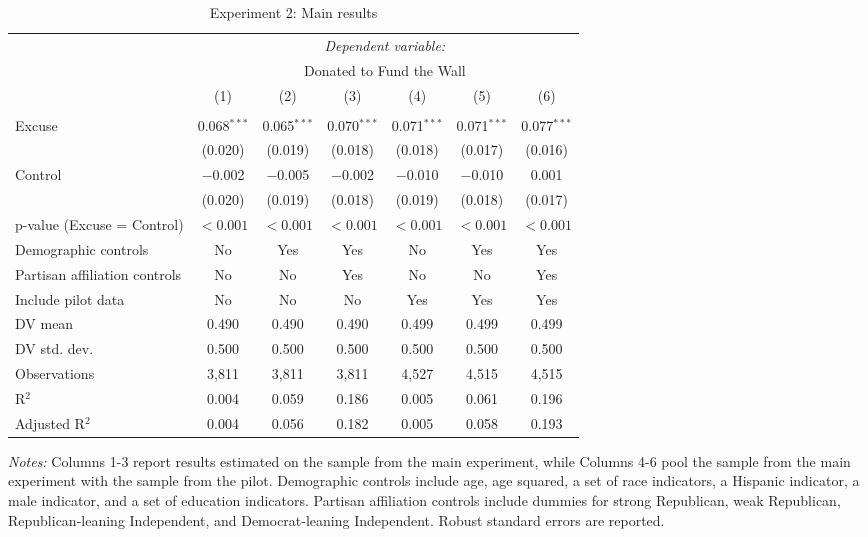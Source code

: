 
\begin{table}[!htbp] \centering 
  \caption{Experiment 2: Main results} 
  \label{t:2-main} 
\begin{threeparttable}
\begin{tabular}{@{\hspace{5pt}}l@{\hspace{5pt}}cccccc} 
\toprule 
 & \multicolumn{6}{c}{\textit{Dependent variable:}} \\ 
\cmidrule(rr){2-7} 
 & \multicolumn{6}{c}{Donated to Fund the Wall} \\ 
 \cmidrule(rr){2-7}
 & (1) & (2) & (3) & (4) & (5) & (6)\\ 
\midrule  
\\[-2.1ex] Excuse & 0.068$^{***}$ & 0.065$^{***}$ & 0.070$^{***}$ & 0.071$^{***}$ & 0.071$^{***}$ & 0.077$^{***}$ \\ 
  & (0.020) & (0.019) & (0.018) & (0.018) & (0.017) & (0.016) \\ 
 \addlinespace 
 Control & $-$0.002 & $-$0.005 & $-$0.002 & $-$0.010 & $-$0.010 & 0.001 \\ 
  & (0.020) & (0.019) & (0.018) & (0.019) & (0.018) & (0.017) \\ 
 \addlinespace 
p-value (Excuse = Control) & $<0.001$ & $<0.001$ & $<0.001$ & $<0.001$ & $<0.001$ & $<0.001$ \\ 
\midrule  
Demographic controls & No & Yes & Yes & No & Yes & Yes \\ 
Partisan affiliation controls & No & No & Yes & No & No & Yes \\ 
\midrule
Include pilot data & No & No & No & Yes & Yes & Yes \\
\addlinespace
DV mean & 0.490 & 0.490 & 0.490 & 0.499 & 0.499 & 0.499 \\
DV std. dev. & 0.500 & 0.500 & 0.500 & 0.500 & 0.500 & 0.500 \\
Observations & 3,811 & 3,811 & 3,811 & 4,527 & 4,515 & 4,515 \\ 
R$^{2}$ & 0.004 & 0.059 & 0.186 & 0.005 & 0.061 & 0.196 \\ 
Adjusted R$^{2}$ & 0.004 & 0.056 & 0.182 & 0.005 & 0.058 & 0.193 \\ 
\bottomrule 
\end{tabular} 
\begin{tablenotes}
\footnotesize
\item \textit{Notes:} Columns 1-3 report results estimated on the sample from the main experiment, while Columns 4-6 pool the sample from the main experiment with the sample from the pilot. Demographic controls include age, age squared, a set of race indicators, a Hispanic indicator, a male indicator, and a set of education indicators. Partisan affiliation controls include dummies for strong Republican, weak Republican, Republican-leaning Independent, and Democrat-leaning Independent. Robust standard errors are reported.
\end{tablenotes}
\end{threeparttable}
\end{table} 
